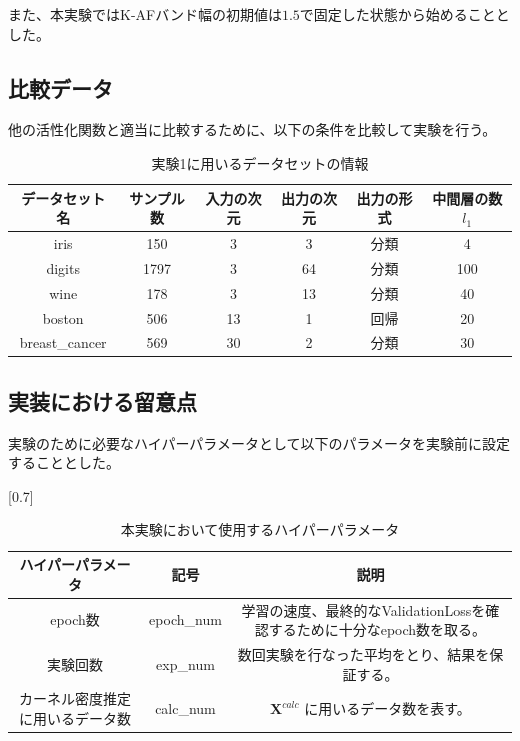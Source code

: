 また、本実験ではK-AFバンド幅の初期値は$ 1.5 $で固定した状態から始めることとした。

\subsection{比較データ}

他の活性化関数と適当に比較するために、以下の条件を比較して実験を行う。


\begin{table}[htbp]
    \begin{center}
        \caption{実験1に用いるデータセットの情報}
        \label{dataset_name}
        \vspace{2mm} 
        \begin{tabular}{ |c|c|c|c|c|c| }
        データセット名 & サンプル数 & 入力の次元 & 出力の次元 & 出力の形式 & 中間層の数 $ {l_1} $ \\
        \hline
        iris           & 150    & 3         & 3        & 分類      & 4 \\
        digits         & 1797   & 3         & 64       & 分類      & 100 \\
        wine           & 178    & 3         & 13       & 分類      & 40 \\
        boston         & 506    & 13        & 1        & 回帰      & 20 \\
        breast\_cancer & 569    & 30        & 2        & 分類      & 30 \\
        \end{tabular}
    \end{center}
\end{table}


\subsection{実装における留意点}
実験のために必要なハイパーパラメータとして以下のパラメータを実験前に設定することとした。

\begin{table}[htbp]
    \begin{center}
        \caption{本実験において使用するハイパーパラメータ}
        \vspace{2mm} 
        \scalebox{0.7}[0.7]{
            \begin{tabular}{||c | c |c||}
            ハイパーパラメータ & 記号 & 説明 \\
            \hline
            epoch数                           & epoch\_num      & 学習の速度、最終的なValidationLossを確認するために十分なepoch数を取る。  \\
            実験回数                           & exp\_num     & 数回実験を行なった平均をとり、結果を保証する。 \\
            カーネル密度推定に用いるデータ数        & calc\_num           & $ \mathbf{X}^{calc} $ に用いるデータ数を表す。  \\
            \end{tabular}
        }
    \end{center}
\end{table}

